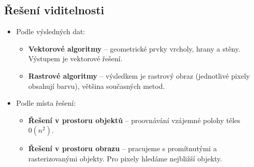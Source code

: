 \subsection{Řešení viditelnosti}
\begin{itemize}
	\item Podle výsledných dat:
	\begin{itemize}
		\item \textbf{Vektorové algoritmy} -- geometrické prvky vrcholy, hrany a stěny. Výstupem je vektorové řešení.
		\item \textbf{Rastrové algoritmy} -- výsledkem je rastrový obraz (jednotlivé pixely obsahují barvu), většina současných metod.
	\end{itemize}
	\item Podle místa řešení:
	\begin{itemize}
		\item \textbf{Řešení v prostoru objektů} -- proovnávání vzájemné polohy těles $0(n^2)$.
		\item \textbf{Řešení v prostoru obrazu} -- pracujeme s promítnutými a rasterizovanými objekty. Pro pixely hledáme nejbližší objekty.
	\end{itemize}
\end{itemize}

